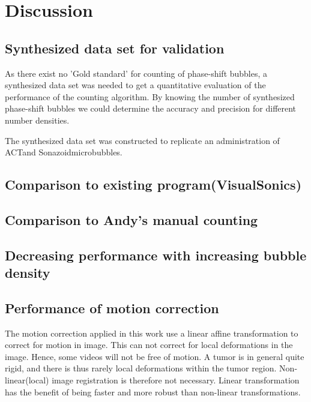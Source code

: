 \section{Discussion}

\subsection{Synthesized data set for validation}
As there exist no 'Gold standard' for counting of phase-shift bubbles, a synthesized data set was needed to get a quantitative evaluation of the performance of the counting algorithm. By knowing the number of synthesized phase-shift bubbles we could determine the accuracy and precision for different number densities.

The synthesized data set was constructed to replicate an administration of ACT\textregistered and Sonazoid\texttrademark microbubbles. 


\subsection{Comparison to existing program(VisualSonics)}
\subsection{Comparison to Andy's manual counting}

\subsection{Decreasing performance with increasing bubble density}
\subsection{Performance of motion correction}
The motion correction applied in this work use a linear affine transformation to correct for motion in image. This can not correct for local deformations in the image. Hence, some videos will not be free of motion. A tumor is in general quite rigid, and there is thus rarely local deformations within the tumor region. Non-linear(local) image registration is therefore not necessary. Linear transformation has the benefit of being faster and more robust than non-linear transformations. 

